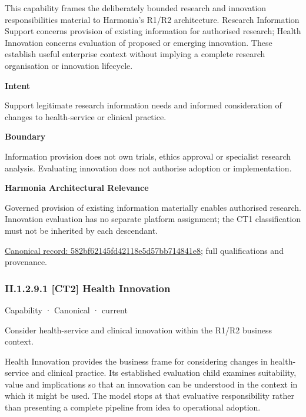 This capability frames the deliberately bounded research and innovation responsibilities material to Harmonia's R1/R2 architecture. Research Information Support concerns provision of existing information for authorised research; Health Innovation concerns evaluation of proposed or emerging innovation. These establish useful enterprise context without implying a complete research organisation or innovation lifecycle.



\textbf{Intent}



Support legitimate research information needs and informed consideration of changes to health-service or clinical practice.



\textbf{Boundary}



Information provision does not own trials, ethics approval or specialist research analysis. Evaluating innovation does not authorise adoption or implementation.



\textbf{Harmonia Architectural Relevance}



Governed provision of existing information materially enables authorised research. Innovation evaluation has no separate platform assignment; the CT1 classification must not be inherited by each descendant.


{\footnotesize \href{../../../../../../../continuum/strategy/capability/582bf62145fd42118e5d57bb714841e8.md}{Canonical record: 582bf62145fd42118e5d57bb714841e8}; full qualifications and provenance.}\par
\subsubsection*{II.1.2.9.1 [CT2] Health Innovation}
\label{navigation:II.1.2.9.1}

\label{element:f263989e25c9469cac1bbad6491432f0}
{\small Capability · Canonical · current}\par

Consider health-service and clinical innovation within the R1/R2 business context.



Health Innovation provides the business frame for considering changes in health-service and clinical practice. Its established evaluation child examines suitability, value and implications so that an innovation can be understood in the context in which it might be used. The model stops at that evaluative responsibility rather than presenting a complete pipeline from idea to operational adoption.



